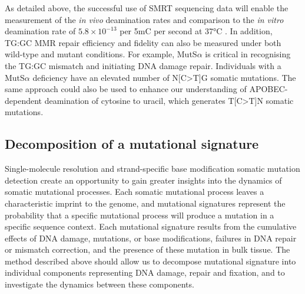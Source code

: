 As detailed above, the successful use of SMRT sequencing data will enable the measurement of the \textit{in vivo} deamination rates and comparison to the \textit{in vitro} deamination rate of $5.8\times10^{-13}$ per 5mC per second at 37°C \cite{Shen1994-of}. In addition, TG:GC MMR repair efficiency and fidelity can also be measured under both wild-type and mutant conditions. For example, MutS$\alpha$ is critical in recognising the TG:GC mismatch and initiating DNA damage repair. Individuals with a MutS$\alpha$ deficiency have an elevated number of N[C>T]G somatic mutations. The same approach could also be used to enhance our understanding of APOBEC-dependent deamination of cytosine to uracil, which generates T[C>T]N somatic mutations. 


\subsection{Decomposition of a mutational signature}

Single-molecule resolution and strand-specific base modification somatic mutation detection create an opportunity to gain greater insights into the dynamics of somatic mutational processes. Each somatic mutational process leaves a characteristic imprint to the genome, and mutational signatures represent the probability that a specific mutational process will produce a mutation in a specific sequence context. Each mutational signature results from the cumulative effects of DNA damage, mutations, or base modifications, failures in DNA repair or mismatch correction, and the presence of these mutation in bulk tissue. The method described above should allow us to decompose mutational signature into individual components representing DNA damage, repair and fixation, and to investigate the dynamics between these components. 


